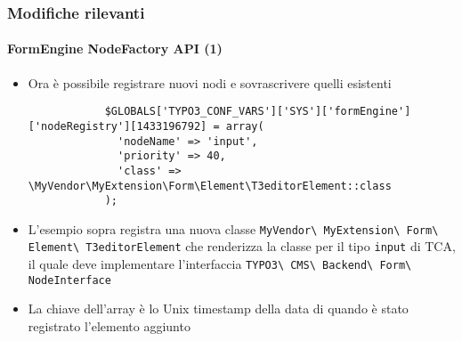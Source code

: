 \begin{frame}[fragile]
	\frametitle{Modifiche rilevanti}
	\framesubtitle{FormEngine NodeFactory API (1)}

	\lstset{basicstyle=\tiny\ttfamily}

	\begin{itemize}

		\item Ora è possibile registrare nuovi nodi e sovrascrivere quelli esistenti

		\begin{lstlisting}
			$GLOBALS['TYPO3_CONF_VARS']['SYS']['formEngine']['nodeRegistry'][1433196792] = array(
			  'nodeName' => 'input',
			  'priority' => 40,
			  'class' => \MyVendor\MyExtension\Form\Element\T3editorElement::class
			);
		\end{lstlisting}

		\item L'esempio sopra registra una nuova classe
			\texttt{MyVendor\textbackslash
				MyExtension\textbackslash
				Form\textbackslash
				Element\textbackslash
				T3editorElement}
			che renderizza la classe per il tipo \texttt{input} di TCA, il quale deve implementare l'interfaccia
			\texttt{TYPO3\textbackslash
				CMS\textbackslash
				Backend\textbackslash
				Form\textbackslash
				NodeInterface}

		\item La chiave dell'array è lo Unix timestamp della data di quando è stato registrato l'elemento aggiunto

	\end{itemize}

\end{frame}


